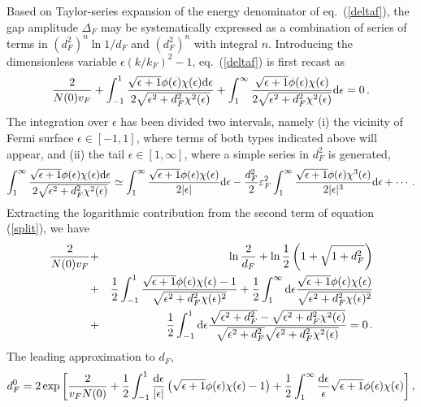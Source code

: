 Based on Taylor-series expansion of the energy denominator of
eq.~(\ref{deltaf}), the gap amplitude $\Delta_F$ may be systematically
expressed as a combination of series of terms in $(d^2_F)^n\ln 1/d_F$ and
$(d^2_F)^n$ with integral $n$.  Introducing the dimensionless variable
$\epsilon (k/k_F)^2 -1$, eq.~(\ref{deltaf})
is first recast as
\begin{equation}
\frac{2}{N(0)v_F} + \int^1_{-1}	\frac{\sqrt{\epsilon+1}\phi(\epsilon)
\chi(\epsilon) {\rm d}\epsilon} {2\sqrt{\epsilon^2 + d^2_F\chi^2(\epsilon)}}
+ \int_1^{\infty}\frac{\sqrt{\epsilon+1}\phi(\epsilon)\chi(\epsilon)}
{2\sqrt{\epsilon^2 + d^2_F\chi^2(\epsilon)}} {\rm d}\epsilon
= 0 \, . \label{split}
\end{equation}
The integration over $\epsilon$ has been divided two intervals, namely
(i) the vicinity of Fermi surface $\epsilon\in[-1,1]$, where terms of
both types indicated above will appear, and (ii) the tail
$\epsilon\in[1,\infty]$, where a simple series in $d^2_F$
is generated,
\begin{equation}
\int_1^{\infty}
\frac{\sqrt{\epsilon+1}\phi(\epsilon)\chi(\epsilon)
{\rm d}\epsilon} {2\sqrt{\epsilon^2 + d^2_F\chi^2(\epsilon)}}
\simeq \int^\infty_1 \frac{\sqrt{\epsilon+1}\phi(\epsilon)\chi(\epsilon)}
{2|\epsilon|}{\rm d}\epsilon -{d^2_F\over 2}\varepsilon^2_F \int^\infty_1
\frac{\sqrt{\epsilon+1}\phi(\epsilon)\chi^3(\epsilon)}{2|\epsilon|^3}
{\rm d}\epsilon + \cdots \, .
\label{onetoinfty}
\end{equation}
Extracting the logarithmic contribution from the second term of equation
(\ref{split}), we have
\begin{eqnarray}
 \frac{2}{N(0)v_F}&+&
\ln \frac2{d_F} + \ln \frac12\left(1+\sqrt{1+d^2_F}\right) \nonumber
\\
&+&
\frac12\int^1_{-1}
	\frac{\sqrt{\epsilon+1}\phi(\epsilon)\chi(\epsilon) - 1}
	{\sqrt{\epsilon^2 + d^2_F\chi(\epsilon)^2}}
+ \frac12 \int_1^\infty {\rm d}\epsilon
	\frac{\sqrt{\epsilon+1}\phi(\epsilon)\chi(\epsilon)}
	{\sqrt{\epsilon^2 + d^2_F\chi(\epsilon)^2}}
\nonumber \\
&+& \frac12\int^1_{-1}  {\rm d}\epsilon
	\frac{\sqrt{\epsilon^2 + d^2_F} - \sqrt{\epsilon^2
        + d^2_F\chi^2(\epsilon)}}
	{\sqrt{\epsilon^2 + d^2_F}\sqrt{\epsilon^2 + d^2_F\chi^2(\epsilon)}} = 0
\, . \label{df}
\end{eqnarray}
The leading approximation to $d_F$,
\begin{equation}
d^0_F = 2 \exp{\left[\frac{2}{v_FN(0)}
+ \frac12\int^1_{-1} \frac{{\rm d}\epsilon}{|\epsilon|}
	\left(\sqrt{\epsilon+1}\phi(\epsilon)\chi(\epsilon) - 1\right)
+ \frac12\int_1^\infty \frac{ {\rm d}\epsilon}{\epsilon}
	\sqrt{\epsilon+1}\phi(\epsilon)\chi(\epsilon)
\right]} \, ,
\label{df0}
\end{equation}
